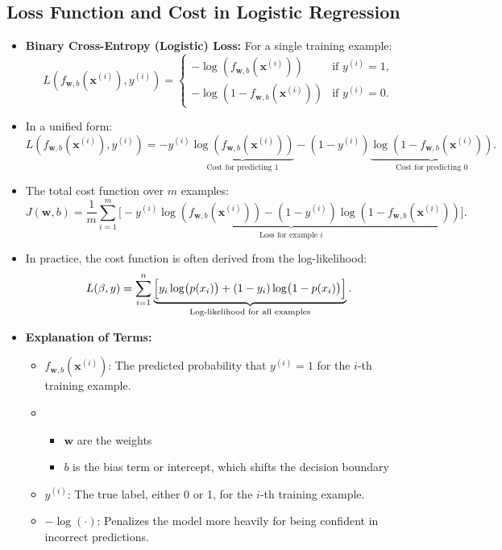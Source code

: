 \documentclass[10pt]{article}
\begin{document}
\subsection{Loss Function and Cost in Logistic Regression}
\begin{itemize}
    \item \textbf{Binary Cross-Entropy (Logistic) Loss:} For a single training example:
    \[
    L\left(f_{\mathbf{w}, b}(\mathbf{x}^{(i)}),y^{(i)}\right)=
    \begin{cases}
    -\log\left(f_{\mathbf{w}, b}(\mathbf{x}^{(i)})\right) & \text{if } y^{(i)}=1, \\[1mm]
    -\log\left(1-f_{\mathbf{w}, b}(\mathbf{x}^{(i)})\right) & \text{if } y^{(i)}=0.
    \end{cases}
    \]

    \item In a unified form:
    \[
    L\left(f_{\mathbf{w}, b}(\mathbf{x}^{(i)}),y^{(i)}\right) 
    = -y^{(i)} \underbrace{\log\left(f_{\mathbf{w}, b}(\mathbf{x}^{(i)})\right)}_{\text{Cost for predicting 1}} 
      - (1-y^{(i)}) \underbrace{\log\left(1-f_{\mathbf{w}, b}(\mathbf{x}^{(i)})\right)}_{\text{Cost for predicting 0}}.
    \]

    \item The total cost function over \( m \) examples:
    \[
    J(\mathbf{w}, b) = \frac{1}{m} \sum_{i=1}^{m} 
    \underbrace{\bigl[-y^{(i)} \log\left(f_{\mathbf{w}, b}(\mathbf{x}^{(i)})\right) 
      - (1-y^{(i)}) \log\left(1-f_{\mathbf{w}, b}(\mathbf{x}^{(i)})\right)\bigr]}_{\text{Loss for example \(i\)}}.
    \]

    \item In practice, the cost function is often derived from the log-likelihood:
    \[
    L(\beta, y) = \sum_{i=1}^{n} \underbrace{\Bigl[y_{i}\log\bigl(p(x_i)\bigr) + (1-y_{i})\log\bigl(1-p(x_i)\bigr)\Bigr]}_{\text{Log-likelihood for all examples}}.
    \]

    \item \textbf{Explanation of Terms:}
    \begin{itemize}
        \item \(f_{\mathbf{w}, b}(\mathbf{x}^{(i)})\): The predicted probability that \(y^{(i)} = 1\) for the \(i\)-th training example.
        \item \begin{itemize}
            \item $\mathbf{w}$ are the weights
            \item $b$ is the bias term or intercept, which shifts the decision boundary
        \end{itemize}
        \item \(y^{(i)}\): The true label, either 0 or 1, for the \(i\)-th training example.
        \item \(-\log(\cdot)\): Penalizes the model more heavily for being confident in incorrect predictions.
    \end{itemize}


\end{itemize}
\end{document}
